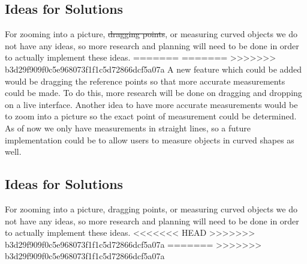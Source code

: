 \documentclass[12pt, titlepage]{article}
\begin{document}
\subsection{Ideas for Solutions}
For zooming into a picture, \sout{dragging points}, or measuring curved objects we do not have any ideas, so more research and planning will need to be done in order to actually implement these ideas. 
=======
=======
>>>>>>> b3d29f909f0c5e968073f1f1c5d72866dcf5a07a
A new feature which could be added would be dragging the reference points so that more accurate measurements could be made. To do this, more research will be done on dragging and dropping on a live interface. Another idea to have more accurate measurements would be to zoom into a picture so the exact point of measurement could be determined. As of now we only have measurements in straight lines, so a future implementation could be to allow users to measure objects in curved shapes as well. 

\subsection{Ideas for Solutions}
For zooming into a picture, dragging points, or measuring curved objects we do not have any ideas, so more research and planning will need to be done in order to actually implement these ideas. 
<<<<<<< HEAD
>>>>>>> b3d29f909f0c5e968073f1f1c5d72866dcf5a07a
=======
>>>>>>> b3d29f909f0c5e968073f1f1c5d72866dcf5a07a
\end{document}
